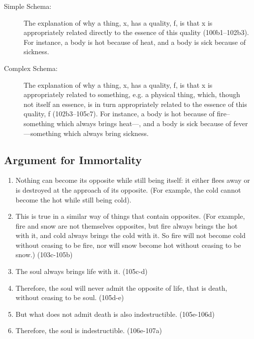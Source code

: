 \documentclass[oneside]{article}
\begin{document}
\begin{description}
\item[Simple Schema:] The explanation of why a thing, x, has a quality, f, is that x is appropriately related directly to the essence of this quality (100b1–102b3). For instance, a body is hot because of heat,  and a body is  sick because of sickness. 
\item[Complex Schema:]  The explanation of why a thing, x, has a quality, f, is that x is appropriately related to something, e.g. a physical thing, which, though not itself an essence, is in turn appropriately related to the essence of this quality, f (102b3–105c7). For instance, a body is hot because of fire--something which always brings heat---, and a body is sick because of fever---something which always bring sickness. 
\end{description}

\subsection*{Argument for Immortality}
\begin{enumerate}
\item Nothing can become its opposite while still being itself: it either flees away or is destroyed at the approach of its opposite.  (For example, the cold cannot become the hot while still being cold). 
\item This is true in a similar way of things that contain opposites.  (For example, fire and snow are not themselves opposites, but fire always brings the hot with it, and cold always brings the cold with it.  So fire will not become cold without ceasing to be fire, nor will snow become hot without ceasing to be snow.) (103c-105b)
\item The soul always brings life with it. (105c-d)
\item Therefore, the soul will never admit the opposite of life, that is death, without ceasing to be soul. (105d-e)
\item But what does not admit death is also indestructible. (105e-106d)
\item  Therefore, the soul is indestructible. (106e-107a)
\end{enumerate}
\end{document}
